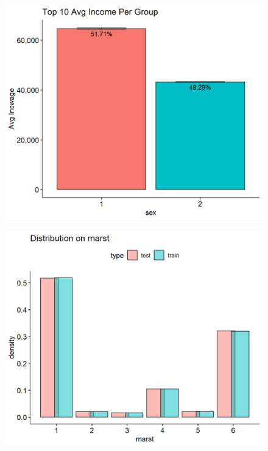\documentclass[11pt, letter,twocolumn]{article}
\begin{document}
\begin{figure}[ht]
	\centering
	\label{fig:unnamed-chunk-7-2}
	\includegraphics[width=0.9\linewidth]{imgs/preliminary_analysis/unnamed-chunk-7-2}
\end{figure}


\begin{figure}[ht]
	\centering
	\label{fig:unnamed-chunk-7-3}
	\includegraphics[width=0.9\linewidth]{imgs/preliminary_analysis/unnamed-chunk-7-3}
\end{figure}
\end{document}
